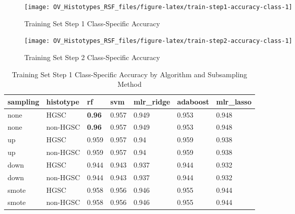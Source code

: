 \documentclass[
]{report}
\begin{document}
\begin{figure}[H]

{\centering \texttt{[image: OV\_Histotypes\_RSF\_files/figure-latex/train-step1-accuracy-class-1]} 

}

\caption{Training Set Step 1 Class-Specific Accuracy}\label{fig:train-step1-accuracy-class}
\end{figure}

\begin{figure}[H]

{\centering \texttt{[image: OV\_Histotypes\_RSF\_files/figure-latex/train-step2-accuracy-class-1]} 

}

\caption{Training Set Step 2 Class-Specific Accuracy}\label{fig:train-step2-accuracy-class}
\end{figure}

\begin{table}

\caption{\label{tab:train-step1-accuracy-class-table}Training Set Step 1 Class-Specific Accuracy by Algorithm and Subsampling Method}
\centering
\begin{tabular}[t]{l|l|l|l|l|l|l}
\hline
sampling & histotype & rf & svm & mlr\_ridge & adaboost & mlr\_lasso\\
\hline
none & HGSC & \textbf{0.96} & 0.957 & 0.949 & 0.953 & 0.948\\
\hline
none & non-HGSC & \textbf{0.96} & 0.957 & 0.949 & 0.953 & 0.948\\
\hline
up & HGSC & 0.959 & 0.957 & 0.94 & 0.959 & 0.938\\
\hline
up & non-HGSC & 0.959 & 0.957 & 0.94 & 0.959 & 0.938\\
\hline
down & HGSC & 0.944 & 0.943 & 0.937 & 0.944 & 0.932\\
\hline
down & non-HGSC & 0.944 & 0.943 & 0.937 & 0.944 & 0.932\\
\hline
smote & HGSC & 0.958 & 0.956 & 0.946 & 0.955 & 0.944\\
\hline
smote & non-HGSC & 0.958 & 0.956 & 0.946 & 0.955 & 0.944\\
\hline
\end{tabular}
\end{table}
\end{document}
